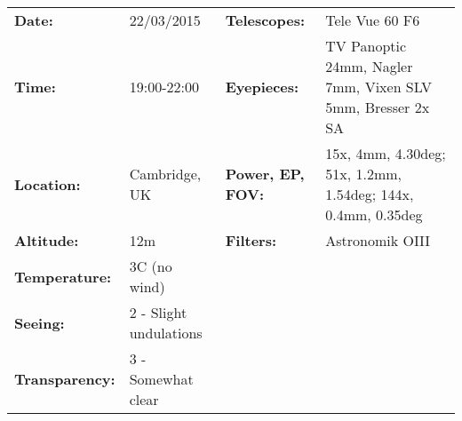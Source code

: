 \begin{tabular}{ p{0.9in} p{1.3in} p{1.2in} p{5.2in}}
{\bf Date:} & 22/03/2015 & {\bf Telescopes:} & Tele Vue 60 F6 \\ 
{\bf Time:} & 19:00-22:00 & {\bf Eyepieces:} & TV Panoptic 24mm, Nagler 7mm, Vixen SLV 5mm, Bresser 2x SA \\ 
{\bf Location:} & Cambridge, UK & {\bf Power, EP, FOV:} & 15x, 4mm, 4.30deg; 51x, 1.2mm, 1.54deg; 144x, 0.4mm, 0.35deg \\ 
{\bf Altitude:} & 12m & {\bf Filters:} & Astronomik OIII \\ 
{\bf Temperature:} & 3C (no wind) & & \\ 
{\bf Seeing:} & 2 - Slight undulations & & \\ 
{\bf Transparency:} & 3 - Somewhat clear & & \\ 
\end{tabular}
